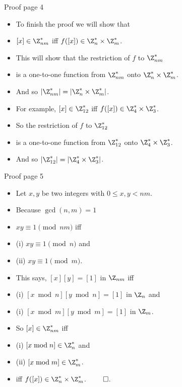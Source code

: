 \documentclass{beamer}
\begin{document}
\begin{frame}{Proof page 4}

\begin{itemize}
  \item To finish the proof we will show that
  \item $[x] \in \Z_{nm}^*$ iff $f([x]) \in \Z_n^* \times \Z_m^*$.
  \item This will show that the restriction of $f$ to $\Z_{nm}^*$
  \item is a one-to-one function from $\Z_{nm}^*$ onto $\Z_n^* \times \Z_m^*$.
  \item And so $|\Z_{nm}^*| = |\Z_n^* \times \Z_m^*|$.
  \item For example, $[x] \in \Z_{12}^*$ iff $f([x]) \in \Z_4^* \times \Z_3^*$.
  \item So the restriction of $f$ to $\Z_{12}^*$
  \item is a one-to-one function from $\Z_{12}^*$ onto $\Z_4^* \times \Z_3^*$.
  \item And so $|\Z_{12}^*| = |\Z_4^* \times \Z_3^*|$.
\end{itemize}

\end{frame}

\begin{frame}{Proof page 5}

\begin{itemize}
  \item Let $x,y$ be two integers with $0\leq x,y < nm$.
  \item Because $\gcd(n,m)=1$
  \item $xy \equiv 1 \pmod {nm}$ iff
  \item (i) $xy \equiv 1 \pmod n$ and
  \item (ii) $xy \equiv 1 \pmod m$.
  \item This says, $[x][y] = [1]$ in $\Z_{nm}$ iff
  \item (i) $[x \bmod n] [y\bmod n] = [1]$ in $\Z_{n}$ and
  \item (i) $[x \bmod m] [y\bmod m] = [1]$ in $\Z_{m}$.
  \item So $[x]\in \Z_{nm}^*$ iff
  \item (i) $[x \bmod n] \in \Z_n^*$ and
  \item (ii) $[x \bmod m] \in \Z_m^*$.
  \item iff $f([x])\in \Z_n^* \times \Z_m^*$. $\qed$.
\end{itemize}

\end{frame}
\end{document}
